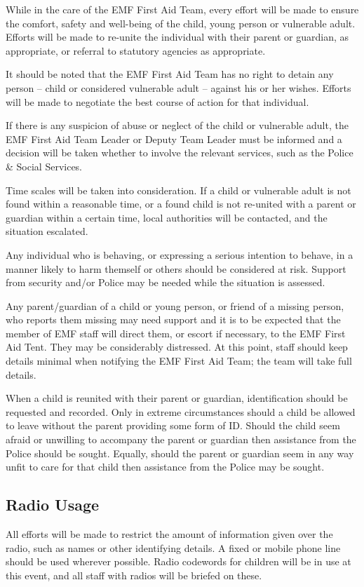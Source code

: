 While in the care of the EMF First Aid Team, every effort will be made to
ensure the comfort, safety and well-being of the child, young person or
vulnerable adult. Efforts will be made to re-unite the
individual with their parent or guardian, as appropriate, or referral to
statutory agencies as appropriate.

It should be noted that the EMF First Aid Team has no right to detain any
person -- child or considered vulnerable adult -- against his or her wishes.
Efforts will be made to negotiate the best course of action for that
individual.

If there is any suspicion of abuse or neglect of the child or vulnerable adult,
the EMF First Aid Team Leader or Deputy Team Leader must be informed and a
decision will be taken whether to involve the relevant services, such as the
Police \& Social Services.

Time scales will be taken into consideration. If a child or vulnerable adult is
not found within a reasonable time, or a found child is not re-united with a
parent or guardian within a certain time, local authorities will be contacted,
and the situation escalated.

Any individual who is behaving, or expressing a serious intention to behave, in
a manner likely to harm themself or others should be considered at risk.
Support from security and/or Police may be needed while the situation is
assessed.

Any parent/guardian of a child or young person, or friend of a missing person,
who reports them missing may need support and it is to be expected that the
member of EMF staff will direct them, or escort if necessary, to the EMF First
Aid Tent. They may be considerably distressed. At this point, staff should keep
details minimal when notifying the EMF First Aid Team; the team will take full
details.

When a child is reunited with their parent or guardian, identification should be
requested and recorded. Only in extreme circumstances should a child be
allowed to leave without the parent providing some form of ID. Should the child
seem afraid or unwilling to accompany the parent or guardian then assistance
from the Police should be sought. Equally, should the parent or guardian
seem in any way unfit to care for that child then assistance from the
Police may be sought.

\subsection{Radio Usage}
All efforts will be made to restrict the amount of information given over the
radio, such as names or other identifying details. A fixed or mobile phone line
should be used wherever possible. Radio codewords for children will be in
use at this event, and all staff with radios will be briefed on these.

